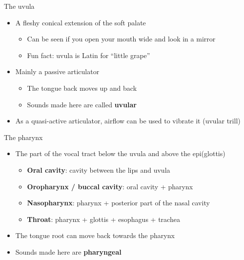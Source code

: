 \documentclass[professionalfonts]{beamer}
\begin{document}
\begin{frame}{The uvula}
    \begin{itemize}
        \item A fleshy conical extension of the soft palate
        \begin{itemize}
            \item Can be seen if you open your mouth wide and look in a mirror
            \item Fun fact: uvula is Latin for “little grape”
        \end{itemize}
        \item Mainly a passive articulator
        \begin{itemize}
            \item The tongue back moves up and back
            \item Sounds made here are called \textbf{uvular}
        \end{itemize}
        \item As a quasi-active articulator, airflow can be used to vibrate it (uvular trill)
    \end{itemize}
\end{frame}

\begin{frame}{The pharynx}
    \begin{itemize}
        \item The part of the vocal tract below the uvula and above the epi(glottis)
        \begin{itemize}
            \item \textbf{Oral cavity}: cavity between the lips and uvula
            \item \textbf{Oropharynx / buccal cavity}: oral cavity + pharynx
            \item \textbf{Nasopharynx}: pharynx + posterior part of the nasal cavity
            \item \textbf{Throat}: pharynx + glottis + esophagus + trachea
        \end{itemize}
        \item The tongue root can move back towards the pharynx
        \item Sounds made here are \textbf{pharyngeal}
    \end{itemize}
\end{frame}
\end{document}
